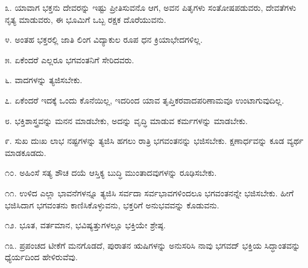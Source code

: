 ೩. ಯಾವಾಗ ಭಕ್ತನು ದೇವರನ್ನು ಇಷ್ಟು ಪ್ರೀತಿಸುವನೊ ಆಗ, ಅವನ ಪಿತೃಗಳು ಸಂತೋಷಪಡುವರು, ದೇವತೆಗಳು ನೃತ್ಯ ಮಾಡುವರು, ಈ ಭೂಮಿಗೆ ಒಬ್ಬ ರಕ್ಷಕ ದೊರೆಯುವನು.

೪. ಅಂತಹ ಭಕ್ತರಲ್ಲಿ ಜಾತಿ ಲಿಂಗ ವಿದ್ಯಾಕುಲ ರೂಪ ಧನ ಕ್ರಿಯಾಭೇದಗಳಿಲ್ಲ.

೫. ಏಕೆಂದರೆ ಎಲ್ಲರೂ ಭಗವಂತನಿಗೆ ಸೇರಿದವರು.

೬. ವಾದಗಳನ್ನು ತ್ಯಜಿಸಬೇಕು.

೭. ಏಕೆಂದರೆ ಇದಕ್ಕೆ ಒಂದು ಕೊನೆಯಿಲ್ಲ, ಇದರಿಂದ ಯಾವ ತೃಪ್ತಿಕರವಾದ\break ಪರಿಣಾಮವೂ ಉಂಟಾಗುವುದಿಲ್ಲ.

೮. ಭಕ್ತಿಶಾಸ್ತ್ರವನ್ನು ಮನನ ಮಾಡಬೇಕು, ಅದನ್ನು ವೃದ್ಧಿ ಮಾಡುವ ಕರ್ಮಗಳನ್ನು ಮಾಡಬೇಕು.

೯. ಸುಖ ದುಃಖ ಲಾಭ ನಷ್ಟಗಳನ್ನು ತ್ಯಜಿಸಿ ಹಗಲು ರಾತ್ರಿ ಭಗವಂತನನ್ನು ಭಜಿಸಬೇಕು. ಕ್ಷಣಾರ್ಧವನ್ನು ಕೂಡ ವ್ಯರ್ಥ ಮಾಡಕೂಡದು.

೧೦. ಅಹಿಂಸೆ ಸತ್ಯ ಶೌಚ ದಯೆ ಆಸ್ತಿಕ್ಯ ಬುದ್ಧಿ ಮುಂತಾದವುಗಳನ್ನು ರೂಢಿಸಬೇಕು.

೧೧. ಉಳಿದ ಎಲ್ಲಾ ಭಾವನೆಗಳನ್ನೂ ತ್ಯಜಿಸಿ ಸರ್ವದಾ ಸರ್ವಭಾವಗಳಿಂದಲೂ ಭಗವಂತನನ್ನೇ ಭಜಿಸಬೇಕು. ಹೀಗೆ ಭಜಿಸಿದಾಗ ಭಗವಂತನು ಕಾಣಿಸಿಕೊಳ್ಳುವನು, ಭಕ್ತರಿಗೆ ಅನುಭವವನ್ನು ಕೊಡುವನು.

೧೨. ಭೂತ, ವರ್ತಮಾನ, ಭವಿಷ್ಯತ್ತುಗಳಲ್ಲೂ ಭಕ್ತಿಯೇ ಶ್ರೇಷ್ಠ.

೧೩. ಪ್ರಪಂಚದ ಟೀಕೆಗೆ ಮನಗೊಡದೆ, ಪುರಾತನ ಋಷಿಗಳನ್ನು ಅನುಸರಿಸಿ ನಾವು ಭಗವದ್​ ಭಕ್ತಿಯ ಸಿದ್ಧಾಂತವನ್ನು ಧ್ಯೆರ್ಯದಿಂದ ಹೇಳಿರುವೆವು.

